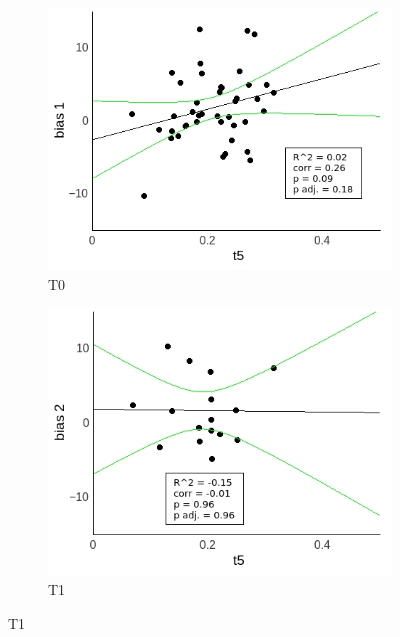 \documentclass[a4paper]{scrreprt}
\begin{document}
\begin{figure}
\centering
\begin{subfigure}[b]{0.49\textwidth}
        \includegraphics[width=\textwidth]{figs/sec3/t5/t5no_diff_1_mod2dat.jpeg}
        \caption{T0}
    \end{subfigure}
    \begin{subfigure}[b]{0.49\textwidth}
        \includegraphics[width=\textwidth]{figs/sec3/t5/t5no_diff_2_mod2dat.jpeg}
        \caption{T1}
    \end{subfigure}


\end{figure}
\end{document}
